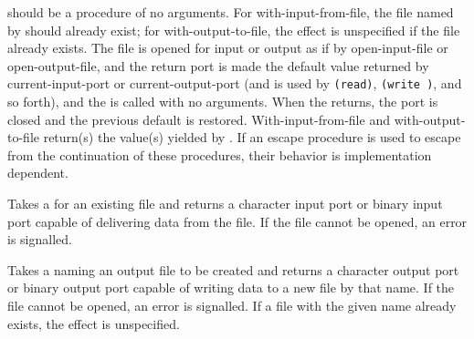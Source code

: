 \begin{entry}{%
}

 should be a procedure of no arguments.
For {\cf with-input-from-file},
the file named by  should already exist; for
{\cf with-output-to-file},
the effect is unspecified if the file
already exists.
The file is opened for input or output
as if by {\cf open-input-file} or {\cf open-output-file}, 
and the return port is made the default value returned by
{\cf current-input-port} or {\cf current-output-port}
(and is used by {\tt (read)}, {\tt (write )}, and so forth),
and the
 is called with no arguments.  When the  returns,
the port is closed and the previous default is restored.
{\cf With-input-from-file} and {\cf with-output-to-file} return(s) the
value(s) yielded by .
If an escape procedure
is used to escape from the continuation of these procedures, their
behavior is implementation dependent.




\end{entry}


\begin{entry}{%
}
 
Takes a  for an existing file and returns a character
input port or binary input port capable of delivering data from the
file.  If the file cannot be opened, an error is signalled.

\end{entry}


\begin{entry}{%
}

Takes a  naming an output file to be created and returns a
character output port or binary output port capable of writing
data to a new file by that name.  If the file cannot be opened,
an error is signalled.  If a file with the given name already exists,
the effect is unspecified.

\end{entry}


